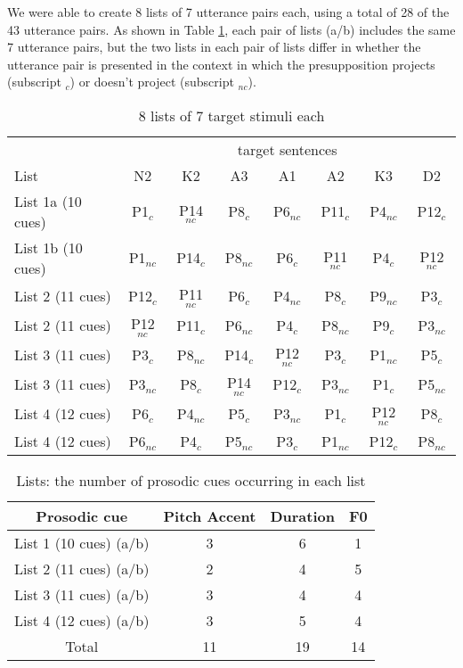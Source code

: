 \documentclass[dina4,12pt,fleqn]{article}
\newcommand{\6}{\mbox{$[\hspace*{-.6mm}[$}}
\newcommand{\9}{\mbox{$]\hspace*{-.6mm}]$}}
\begin{document}
We were able to create 8 lists of 7 utterance pairs each, using a total of 28 of the 43 utterance pairs. As shown in Table \ref{table1}, each pair of lists (a/b) includes the same 7 utterance pairs, but the two lists in each pair of lists differ in whether the utterance pair is presented in the context in which the presupposition projects (subscript $_{c}$) or doesn't project (subscript $_{nc}$). 

\begin{table}[!h]
    \centering
\begin{tabular}{l | ccccccc}

& \multicolumn{7}{c}{target sentences}  \\ 
  List                           & N2   & K2    & A3    & A1    & A2    & K3    & D2 \\
             \hline\hline
List 1a (10 cues)    & P1$_{c}$  & P14$_{nc}$   & P8$_{c}$     & P6$_{nc}$    & P11$_{c}$    & P4$_{nc}$    & P12$_{c}$  \\
List 1b (10 cues)    & P1$_{nc}$   & P14$_{c}$    & P8$_{nc}$    & P6$_{c}$     & P11$_{nc}$   & P4$_{c}$     & P12$_{nc}$ \\
\hline
List 2 (11 cues)     & P12$_{c}$  & P11$_{nc}$   & P6$_{c}$    & P4$_{nc}$    & P8$_{c}$    & P9$_{nc}$    & P3$_{c}$ \\
List 2 (11 cues)     & P12$_{nc}$  & P11$_{c}$   & P6$_{nc}$    & P4$_{c}$    & P8$_{nc}$    & P9$_{c}$    & P3$_{nc}$ \\
\hline
List 3 (11 cues)     & P3$_{c}$   & P8$_{nc}$    & P14$_{c}$   & P12$_{nc}$   & P3$_{c}$    & P1$_{nc}$    & P5$_{c}$ \\
List 3 (11 cues)     & P3$_{nc}$   & P8$_{c}$    & P14$_{nc}$   & P12$_{c}$   & P3$_{nc}$    & P1$_{c}$    & P5$_{nc}$ \\
\hline
List 4 (12 cues)     & P6$_{c}$   & P4$_{nc}$   & P5$_{c}$    & P3$_{nc}$    & P1$_{c}$    & P12$_{nc}$   & P8$_{c}$ \\
List 4 (12 cues)     & P6$_{nc}$   & P4$_{c}$   & P5$_{nc}$    & P3$_{c}$    & P1$_{nc}$    & P12$_{c}$   & P8$_{nc}$ \\

\end{tabular}
    \caption{8 lists of 7 target stimuli each}
    \label{table1}
\end{table}

\begin{table}[!h]
    \centering
\begin{tabular}{|c|c|c|c|}
                \hline
Prosodic cue    & Pitch Accent   & Duration    & F0   \\
             \hline
List 1 (10 cues) (a/b)   & 3   & 6   & 1  \\
List 2 (11 cues) (a/b)    & 2  & 4   & 5    \\
List 3 (11 cues) (a/b)    & 3   & 4    & 4   \\
List 4 (12 cues) (a/b)    & 3   & 5   & 4   \\
\hline
Total & 11 & 19 & 14\\
\hline
\end{tabular}
    \caption{Lists: the number of prosodic cues occurring in each list}
    \label{table2}
\end{table}
\end{document}
